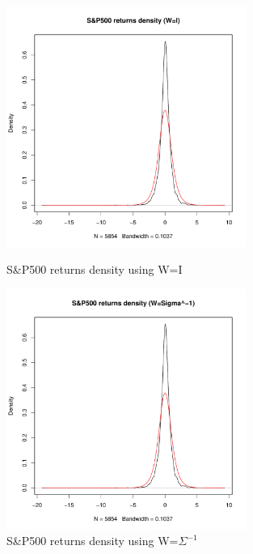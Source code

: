 \begin{figure}\label{SP500_returns_density}
    \centering
    \includegraphics[width=0.7\textwidth]{S&P500_returns_density_(W=I).pdf}
    \caption{S\&P500 returns density using W=I}
    \includegraphics[width=0.7\textwidth]{S&P500_returns_density_(W=Sigma^-1).pdf}
    \caption{S\&P500 returns density using W=$\Sigma^{-1}$}
\end{figure}